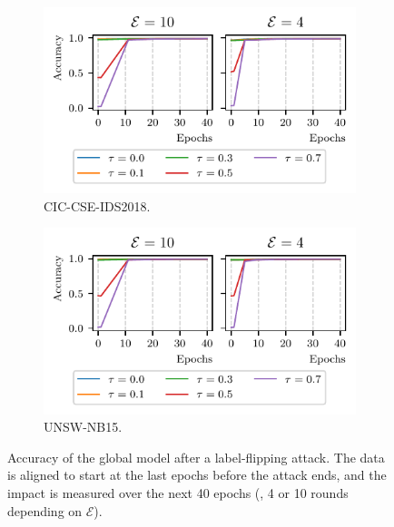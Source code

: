 \begin{figure}
  \centering
  \begin{subfigure}{.49\linewidth}
    \centering
    \includegraphics[width=\linewidth]{figures/cicids/redemption}
    \caption{
      CIC-CSE-IDS2018.
      \label{fig:assess.hyperparams-redemption.cicids}
    }
  \end{subfigure}
  \hfill
  \begin{subfigure}{.49\linewidth}
    \centering
    \includegraphics[width=\linewidth]{figures/nb15/redemption}
    \caption{
      UNSW-NB15.
      \label{fig:assess.hyperparams-redemption.nb15}
    }
  \end{subfigure}
  \caption[
    Accuracy of the global model after a label-flipping attack.
  ]{
    Accuracy of the global model after a label-flipping attack.
    The data is aligned to start at the last epochs before the attack ends, and the impact is measured over the next 40 epochs (\ie, 4 or 10 rounds depending on $\mathcal{E}$).
  }
  \label{fig:redemption}
\end{figure}

